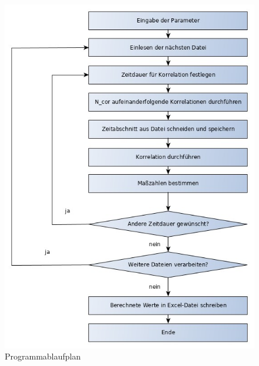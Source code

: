 \begin{figure}[ht!]
  \centering
  \includegraphics[scale=0.6]{img/pap}
  \caption{Programmablaufplan}
  \label{figure1}
\end{figure}

